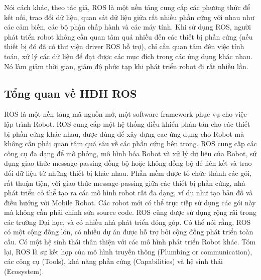 Nói cách khác, theo tác giả, ROS là một nền tảng cung cấp các phương thức để kết nối, trao đổi dữ liệu, quan sát dữ liệu giữa rất nhiều phần cứng với nhau như các cảm biến, các bộ phận chấp hành và các máy tính. Khi sử dụng ROS, người phát triển robot không cần quan tâm quá nhiều đến các thiết bị phần cứng (nếu thiết bị đó đã có thư viện driver ROS hỗ trợ), chỉ cần quan tâm đên việc tính toán, xử lý các dữ liệu để đạt được các mục đích trong các ứng dụng khác nhau. Nó làm giảm thời gian, giảm độ phức tạp khi phát triển robot đi rất nhiều lần. 

\subsection{Tổng quan về HĐH ROS}
ROS là một nền tảng mã nguồn mở, một software framework phục vụ cho việc
lập trình Robot. ROS cung cấp một hệ thống điều khiển phân tán cho các thiết bị
phần cứng khác nhau, được dùng để xây dựng cac ứng dụng cho Robot mà không
cần phải quan tâm quá sâu về các phần cứng bên trong. ROS cung cấp các công cụ
đa dạng để mô phỏng, mô hình hóa Robot và xử lý dữ liệu của Robot, sử dụng giao
thức message-passing đồng bộ hoặc không đồng bộ để liên kết và trao đổi dữ liệu
từ những thiết bị khác nhau.
Phần mềm được tổ chức thành các gói, rất thuận tiện, với giao thức message-passing giữa các thiết bị phần cứng, nhà phát triển có thể tạo ra các mô hình robot
rất đa dạng, ví dụ như tạo bản đồ và điều hướng với Mobile Robot. Các robot mới
có thể trực tiếp sử dụng các gói này mà không cần phải chỉnh sửa source code.
ROS cũng được sử dụng rộng rãi trong các trường Đại học, và có nhiều nhà phát
triển đóng góp. Có thể nói rằng, ROS có một cộng đồng lớn, có nhiều dự án được
hỗ trợ bởi cộng đồng phát triển toàn cầu. Có một hệ sinh thái thân thiện với các
mô hình phát triển Robot khác.
Tóm lại, ROS là sự kết hợp của mô hình truyền thông (Plumbing or
communication), các công cụ (Tools), khả năng phần cứng (Capabilities) và hệ
sinh thái (Ecosystem). 

